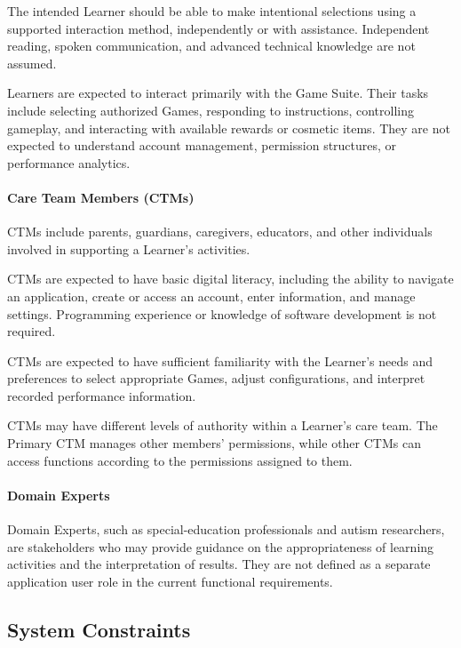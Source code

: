 \documentclass[12pt]{article}
\begin{document}
The intended Learner should be able to make intentional selections using a
supported interaction method, independently or with assistance. Independent
reading, spoken communication, and advanced technical knowledge are not assumed.

Learners are expected to interact primarily with the Game Suite. Their tasks
include selecting authorized Games, responding to instructions, controlling
gameplay, and interacting with available rewards or cosmetic items. They are not
expected to understand account management, permission structures, or performance
analytics.

\paragraph{Care Team Members (CTMs)}

CTMs include parents, guardians, caregivers, educators, and other individuals
involved in supporting a Learner's activities.

CTMs are expected to have basic digital literacy, including the ability to
navigate an application, create or access an account, enter information, and
manage settings. Programming experience or knowledge of software development is
not required.

CTMs are expected to have sufficient familiarity with the Learner's needs and
preferences to select appropriate Games, adjust configurations, and interpret
recorded performance information.

CTMs may have different levels of authority within a Learner's care team. The
Primary CTM manages other members' permissions, while other CTMs can access
functions according to the permissions assigned to them.

\paragraph{Domain Experts}

Domain Experts, such as special-education professionals and autism researchers,
are stakeholders who may provide guidance on the appropriateness of learning
activities and the interpretation of results. They are not defined as a separate
application user role in the current functional requirements.

\subsection{System Constraints}
\end{document}
